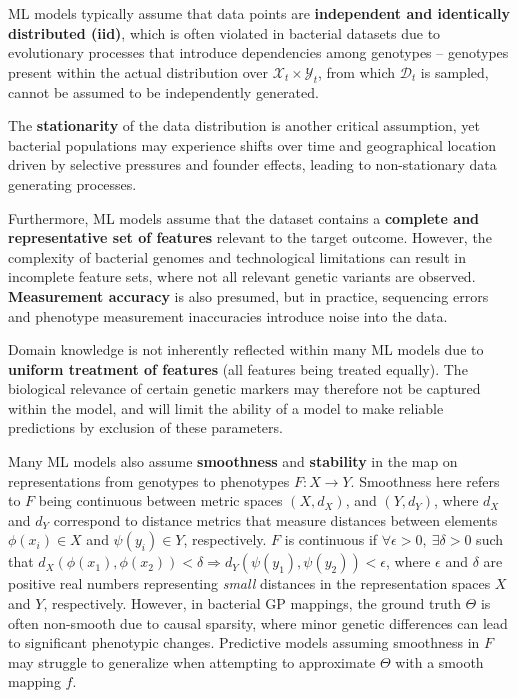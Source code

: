\documentclass[12pt]{article}
\begin{document}
ML models typically assume that data points are \textbf{independent and identically distributed (iid)}, which is often violated in bacterial datasets due to evolutionary processes that introduce dependencies among genotypes -- genotypes present within the actual distribution over $\mathcal{X}_t \times \mathcal{Y}_t$, from which $\mathcal{D}_t$ is sampled, cannot be assumed to be independently generated.

The \textbf{stationarity} of the data distribution is another critical assumption, yet bacterial populations may experience shifts over time and geographical location driven by selective pressures and founder effects, leading to non-stationary data generating processes. 

Furthermore, ML models assume that the dataset contains a \textbf{complete and representative set of features} relevant to the target outcome. However, the complexity of bacterial genomes and technological limitations can result in incomplete feature sets, where not all relevant genetic variants are observed. \textbf{Measurement accuracy} is also presumed, but in practice, sequencing errors and phenotype measurement inaccuracies introduce noise into the data. 

Domain knowledge is not inherently reflected within many ML models due to \textbf{uniform treatment of features} (all features being treated equally). The biological relevance of certain genetic markers may therefore not be captured within the model, and will limit the ability of a model to make reliable predictions by exclusion of these parameters.

Many ML models also assume \textbf{smoothness} and \textbf{stability} in the map on representations from genotypes to phenotypes $F: X \rightarrow Y$. Smoothness here refers to $F$ being continuous between metric spaces $(X,d_X)$, and $(Y,d_Y)$, where $d_X$ and $d_Y$ correspond to distance metrics that measure distances between elements $\phi(x_i) \in X$ and $\psi(y_i) \in Y$, respectively. $F$ is continuous if $\forall \epsilon > 0, \: \exists \delta>0$ such that $d_X(\phi(x_1), \phi(x_2)) < \delta \Longrightarrow d_Y(\psi(y_1), \psi(y_2)) < \epsilon$, where $\epsilon$ and $\delta$ are positive real numbers representing \textit{small} distances in the representation spaces $X$ and $Y$, respectively. However, in bacterial GP mappings, the ground truth $\Theta$ is often non-smooth due to causal sparsity, where minor genetic differences can lead to significant phenotypic changes. Predictive models assuming smoothness in $F$ may struggle to generalize when attempting to approximate $\Theta$ with a smooth mapping $f$.
\end{document}
